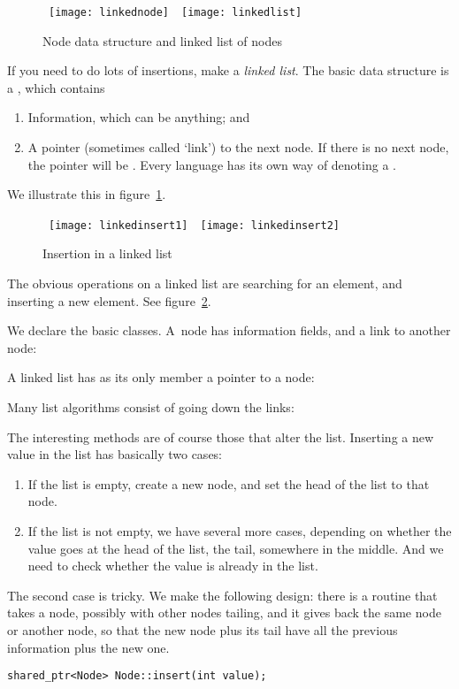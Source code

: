 \begin{figure}[ht]
\hbox{%
  \texttt{[image: linkednode]}
  \
  \texttt{[image: linkedlist]}
  }
  \caption{Node data structure and linked list of nodes}
  \label{fig:linked-node-list}
\end{figure}

If you need to do lots of insertions, make a
\emph{linked list}. The basic data structure is a ,
which contains 
\begin{enumerate}
\item
  Information, which can be anything; and
\item A pointer (sometimes called `link') to the next node. If there
  is no next node, the pointer will be \n{NULL}. Every language has
  its own way of denoting a \indextermsub{null}{pointer}.
\end{enumerate}

We illustrate this in figure~\ref{fig:linked-node-list}.

\begin{figure}[ht]
  \hbox{
  \texttt{[image: linkedinsert1]}
  \
  \texttt{[image: linkedinsert2]}
  }
  \caption{Insertion in a linked list}
  \label{fig:linked-list-insert}
\end{figure}

The obvious operations on a linked list are searching for an element,
and inserting a new element. See figure~\ref{fig:linked-list-insert}.


We declare the basic classes. A~node has information fields, and a
link to another node:
%

A linked list has as its only member a pointer to a node:
%

Many list algorithms consist of going down the links:
%

The interesting methods are of course those that alter the
list. Inserting a new value in the list has basically two cases:
\begin{enumerate}
\item If the list is empty, create a new node, and set the head of the
  list to that node.
\item If the list is not empty, we have several more cases, depending
  on whether the value goes at the head of the list, the tail,
  somewhere in the middle. And we need to check whether the value is
  already in the list.
\end{enumerate}
The second case is tricky. We make the following design: there is a
routine that takes a node, possibly with other nodes tailing, and it
gives back the same node or another node, so that the new node plus
its tail have all the previous information plus the new one.
\begin{verbatim}
shared_ptr<Node> Node::insert(int value);
\end{verbatim}

